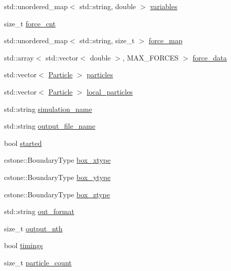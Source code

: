 \begin{DoxyCompactItemize}
\item 
std\+::unordered\+\_\+map$<$ std\+::string, double $>$ \mbox{\hyperlink{namespacewash_a820e90a9045d0f0df213eed09939e1ca}{variables}}
\item 
size\+\_\+t \mbox{\hyperlink{namespacewash_a789543df6661367f3f1c74564b651bc1}{force\+\_\+cnt}}
\item 
std\+::unordered\+\_\+map$<$ std\+::string, size\+\_\+t $>$ \mbox{\hyperlink{namespacewash_a77bf373c7f48aed54e36e089a47a74ab}{force\+\_\+map}}
\item 
std\+::array$<$ std\+::vector$<$ double $>$, M\+A\+X\+\_\+\+F\+O\+R\+C\+ES $>$ \mbox{\hyperlink{namespacewash_a28483034a1e07f656173e973ac88e82b}{force\+\_\+data}}
\item 
std\+::vector$<$ \mbox{\hyperlink{classwash_1_1Particle}{Particle}} $>$ \mbox{\hyperlink{namespacewash_aa7c72cd2ae1de516f31beb4bc63f31ef}{particles}}
\item 
std\+::vector$<$ \mbox{\hyperlink{classwash_1_1Particle}{Particle}} $>$ \mbox{\hyperlink{namespacewash_acb289595df7b8e6626daeeb132e1c445}{local\+\_\+particles}}
\item 
std\+::string \mbox{\hyperlink{namespacewash_a6ec4f15aa36a1ef9fe7ea1a5ddf4480f}{simulation\+\_\+name}}
\item 
std\+::string \mbox{\hyperlink{namespacewash_a4e3b615c7ac7e5c0cc44bfe52b7df557}{output\+\_\+file\+\_\+name}}
\item 
bool \mbox{\hyperlink{namespacewash_a37597bf1ffacb6fb6d4ac5db730fe436}{started}}
\item 
cstone\+::\+Boundary\+Type \mbox{\hyperlink{namespacewash_a8c0da9131f4544d469602bc9f38aaa04}{box\+\_\+xtype}}
\item 
cstone\+::\+Boundary\+Type \mbox{\hyperlink{namespacewash_a90050d690568d13ee3dfee971a349f00}{box\+\_\+ytype}}
\item 
cstone\+::\+Boundary\+Type \mbox{\hyperlink{namespacewash_a9e584dee30db785be9fa1d5a1c5c8220}{box\+\_\+ztype}}
\item 
std\+::string \mbox{\hyperlink{namespacewash_a035f6f724e8c8720dfce129a9de67097}{out\+\_\+format}}
\item 
size\+\_\+t \mbox{\hyperlink{namespacewash_a7b6eb3e63a02fcbd9fafd59e34fbd320}{output\+\_\+nth}}
\item 
bool \mbox{\hyperlink{namespacewash_a40aed5edcd0e0403841e3f83eaa41965}{timings}}
\item 
size\+\_\+t \mbox{\hyperlink{namespacewash_a7845fa82d1b536c12c2d9495ede361ca}{particle\+\_\+count}}
\item 

\end{DoxyCompactItemize}
